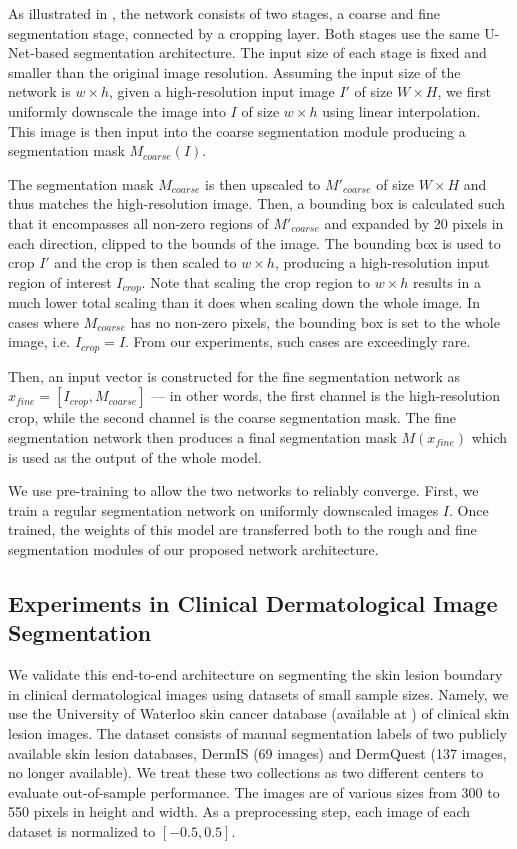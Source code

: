 As illustrated in , the network consists of two stages, a coarse and fine segmentation stage, connected by a cropping layer. Both stages use the same U-Net-based segmentation architecture. The input size of each stage is fixed and smaller than the original image resolution. Assuming the input size of the network is $w \times h$, given a high-resolution input image $I'$ of size $W \times H$, we first uniformly downscale the image into $I$ of size $w \times h$ using linear interpolation. This image is then input into the coarse segmentation module producing a segmentation mask $M_{coarse}(I)$.

The segmentation mask $M_{coarse}$ is then upscaled to $M'_{coarse}$ of size $W \times H$ and thus matches the high-resolution image. Then, a bounding box is calculated such that it encompasses all non-zero regions of $M'_{coarse}$ and expanded by 20 pixels in each direction, clipped to the bounds of the image. The bounding box is used to crop $I'$ and the crop is then scaled to $w \times h$, producing a high-resolution input region of interest $I_{crop}$. Note that scaling the crop region to $w \times h$ results in a much lower total scaling than it does when scaling down the whole image. In cases where $M_{coarse}$ has no non-zero pixels, the bounding box is set to the whole image, i.e. $I_{crop} = I$. From our experiments, such cases are exceedingly rare.

Then, an input vector is constructed for the fine segmentation network as $x_{fine} = [I_{crop}, M_{coarse}]$ --- in other words, the first channel is the high-resolution crop, while the second channel is the coarse segmentation mask. The fine segmentation network then produces a final segmentation mask $M(x_{fine})$ which is used as the output of the whole model.

We use pre-training to allow the two networks to reliably converge. First, we train a regular segmentation network on uniformly downscaled images $I$. Once trained, the weights of this model are transferred both to the rough and fine segmentation modules of our proposed network architecture.

\subsection{Experiments in Clinical Dermatological Image Segmentation}

We validate this end-to-end architecture on segmenting the skin lesion boundary in clinical dermatological images using datasets of small sample sizes. Namely, we use the University of Waterloo skin cancer database \cite{waterloo} (available at \cite{uwaterlooSkinCancer}) of clinical skin lesion images. The dataset consists of manual segmentation labels of two publicly available skin lesion databases, DermIS \cite{dermisDermIS} (69 images) and DermQuest (137 images, no longer available). We treat these two collections as two different centers to evaluate out-of-sample performance. The images are of various sizes from 300 to 550 pixels in height and width. As a preprocessing step, each image of each dataset is normalized to $[-0.5, 0.5]$.

